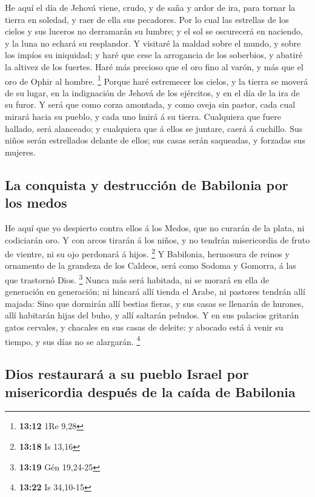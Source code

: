  He aquí el día de Jehová viene, crudo, y de saña y ardor
de ira, para tornar la tierra en soledad, y raer de ella sus pecadores.
 Por lo cual las estrellas de los cielos y sus luceros no
derramarán su lumbre; y el sol se oscurecerá en naciendo, y la luna no
echará su resplandor.  Y visitaré la maldad sobre el
mundo, y sobre los impíos su iniquidad; y haré que cese la arrogancia de
los soberbios, y abatiré la altivez de los fuertes.  Haré
más precioso que el oro fino al varón, y más que el oro de Ophir al
hombre. \footnote{\textbf{13:12} 1Re 9,28}  Porque haré
estremecer los cielos, y la tierra se moverá de su lugar, en la
indignación de Jehová de los ejércitos, y en el día de la ira de su
furor.  Y será que como corza amontada, y como oveja sin
pastor, cada cual mirará hacia su pueblo, y cada uno huirá á su tierra.
 Cualquiera que fuere hallado, será alanceado; y
cualquiera que á ellos se juntare, caerá á cuchillo.  Sus
niños serán estrellados delante de ellos; sus casas serán saqueadas, y
forzadas sus mujeres.

\hypertarget{la-conquista-y-destrucciuxf3n-de-babilonia-por-los-medos}{%
\subsection{La conquista y destrucción de Babilonia por los
medos}\label{la-conquista-y-destrucciuxf3n-de-babilonia-por-los-medos}}

 He aquí que yo despierto contra ellos á los Medos, que
no curarán de la plata, ni codiciarán oro.  Y con arcos
tirarán á los niños, y no tendrán misericordia de fruto de vientre, ni
su ojo perdonará á hijos. \footnote{\textbf{13:18} Is 13,16}
 Y Babilonia, hermosura de reinos y ornamento de la
grandeza de los Caldeos, será como Sodoma y Gomorra, á las que trastornó
Dios. \footnote{\textbf{13:19} Gén 19,24-25}  Nunca más
será habitada, ni se morará en ella de generación en generación; ni
hincará allí tienda el Arabe, ni pastores tendrán allí majada:
 Sino que dormirán allí bestias fieras, y sus casas se
llenarán de hurones, allí habitarán hijas del buho, y allí saltarán
peludos.  Y en sus palacios gritarán gatos cervales, y
chacales en sus casas de deleite: y abocado está á venir su tiempo, y
sus días no se alargarán. \footnote{\textbf{13:22} Is 34,10-15}

\hypertarget{dios-restauraruxe1-a-su-pueblo-israel-por-misericordia-despuuxe9s-de-la-cauxedda-de-babilonia}{%
\subsection{Dios restaurará a su pueblo Israel por misericordia después
de la caída de
Babilonia}\label{dios-restauraruxe1-a-su-pueblo-israel-por-misericordia-despuuxe9s-de-la-cauxedda-de-babilonia}}

